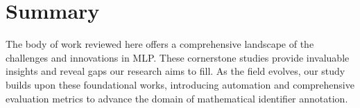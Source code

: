 \section{Summary}

The body of work reviewed here offers a comprehensive landscape of the challenges and innovations in MLP. These cornerstone studies provide invaluable insights and reveal gaps our research aims to fill. As the field evolves, our study builds upon these foundational works, introducing automation and comprehensive evaluation metrics to advance the domain of mathematical identifier annotation.
